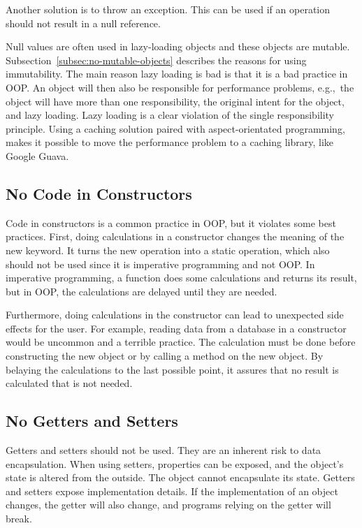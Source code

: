 Another solution is to throw an exception.
This can be used if an operation should not result in a null reference.

Null values are often used in lazy-loading objects and these objects are mutable.
Subsection\ \ref{subsec:no-mutable-objects} describes the reasons for using immutability.
The main reason lazy loading is bad is that it is a bad practice in \gls{OOP}.
An object will then also be responsible for performance problems, e.g.,\ the object will have more than one responsibility,
the original intent for the object, and lazy loading.
Lazy loading is a clear violation of the single responsibility principle.
Using a caching solution paired with aspect-orientated programming, makes it possible to move the performance problem to a caching library, like Google Guava.\cite{elegant-objects}

\subsection{No Code in Constructors}\label{subsec:no-code-in-constructors}
Code in constructors is a common practice in \gls{OOP}, but it violates some best practices.
First, doing calculations in a constructor changes the meaning of the new keyword.
It turns the new operation into a static operation, which also should not be used since it is imperative programming and not \gls{OOP}.
In imperative programming, a function does some calculations and returns its result, but in \gls{OOP}, the calculations are delayed until they are needed.

Furthermore, doing calculations in the constructor can lead to unexpected side effects for the user.
For example, reading data from a database in a constructor would be uncommon and a terrible practice.
The calculation must be done before constructing the new object or by calling a method on the new object.
By belaying the calculations to the last possible point, it assures that no result is calculated that is not needed.\cite{elegant-objects}

\subsection{No Getters and Setters}\label{subsec:no-getters-and-setters}
Getters and setters should not be used.
They are an inherent risk to data encapsulation.
When using setters, properties can be exposed, and the object's state is altered from the outside.
The object cannot encapsulate its state.\cite{encapsulation}
Getters and setters expose implementation details.
If the implementation of an object changes, the getter will also change, and programs relying on the getter will break.

